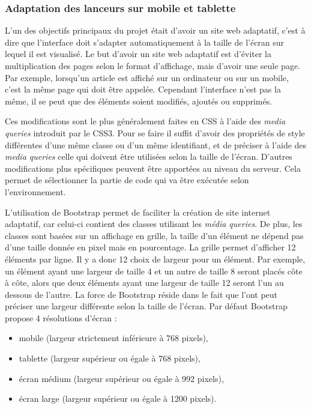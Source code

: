 \documentclass[12pt,a4paper]{article}
\begin{document}
\subsubsection{Adaptation des lanceurs sur mobile et tablette}
L'un des objectifs principaux du projet était d'avoir un site web adaptatif, c'est à dire que l'interface doit s'adapter automatiquement à la taille de l'écran sur lequel il est visualisé. Le but d'avoir un site web adaptatif est d'éviter la multiplication des pages selon le format d'affichage, mais d'avoir une seule page. Par exemple, lorsqu'un article est affiché sur un ordinateur ou sur un mobile, c'est la même page qui doit être appelée. Cependant l'interface n'est pas la même, il se peut que des éléments soient modifiés, ajoutés ou supprimés.\par 
Ces modifications sont le plus généralement faites en CSS à l'aide des \textit{media queries} introduit par le CSS3. Pour se faire il suffit d'avoir des propriétés de style différentes d'une même classe ou d'un même identifiant, et de préciser à l'aide des \textit{media queries} celle qui doivent être utilisées selon la taille de l'écran. D'autres modifications plus spécifiques peuvent être apportées au niveau du serveur. Cela permet de sélectionner la partie de code qui va être exécutée selon l'environnement.\par
\medskip
L'utilisation de Bootstrap permet de faciliter la création de site internet adaptatif, car celui-ci contient des classes utilisant les \textit{média queries}. De plus, les classes sont basées sur un affichage en grille, la taille d'un élément ne dépend pas d'une taille donnée en pixel mais en pourcentage. La grille permet d'afficher 12 éléments par ligne. Il y a donc 12 choix de largeur pour un élément. Par exemple, un élément ayant une largeur de taille 4 et un autre de taille 8 seront placés côte à côte, alors que deux éléments ayant une largeur de taille 12 seront l'un au dessous de l'autre. La force de Bootstrap réside dans le fait que l'ont peut préciser une largeur différente selon la taille de l'écran. Par défaut Bootstrap propose 4 résolutions d'écran :
\begin{itemize}
\item mobile (largeur strictement inférieure à 768 pixels),
\item tablette (largeur supérieur ou égale à 768 pixels),
\item écran médium (largeur supérieur ou égale à 992 pixels),
\item écran large (largeur supérieur ou égale à 1200 pixels).
\end{itemize}
\end{document}
